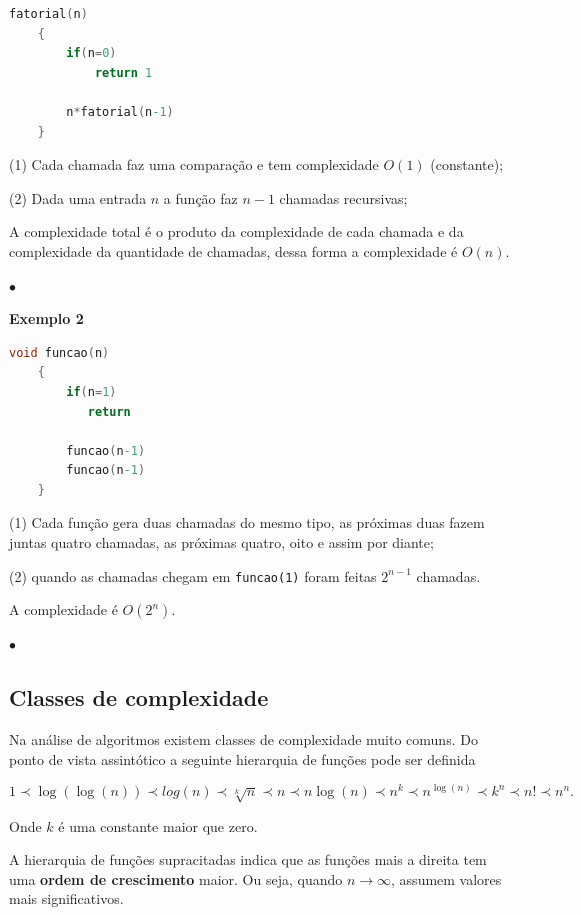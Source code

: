 \begin{lstlisting}[language=C, frame=single]
    fatorial(n)
    {
        if(n=0)
            return 1

        n*fatorial(n-1)
    }
\end{lstlisting}

(1) Cada chamada faz uma comparação e tem complexidade $O(1)$ (constante);

(2) Dada uma entrada $n$ a função faz $n-1$ chamadas recursivas;

A complexidade total é o produto da complexidade de cada chamada e da complexidade da quantidade de chamadas, dessa forma a complexidade é $O(n)$.


{\raggedleft $\bullet$ \par}

\textbf{Exemplo 2} 

\begin{lstlisting}[language=C, frame=single]
    void funcao(n)
    {
        if(n=1)
           return

        funcao(n-1)
        funcao(n-1)
    }
\end{lstlisting}

(1) Cada função gera duas chamadas do mesmo tipo, as próximas duas fazem juntas quatro chamadas, as próximas quatro, oito e assim por diante;

(2) quando as chamadas chegam em \texttt{funcao(1)} foram feitas $2^{n-1}$ chamadas.

A complexidade é $O(2^n)$.
 

{\raggedleft $\bullet$ \par}

\subsection{Classes de complexidade}

Na análise de algoritmos existem classes de complexidade muito comuns. Do ponto de vista assintótico a seguinte hierarquia de funções pode ser definida

\[1\prec \log(\log(n)) \prec log(n) \prec \sqrt[k]{n} \prec n \prec n\log(n) \prec n^k \prec n^{\log(n)} \prec k^n \prec n!\prec n^n.\]

Onde $k$ é uma constante maior que zero.

A hierarquia de funções supracitadas indica que as funções mais a direita tem uma \textbf{ordem de crescimento} maior. Ou seja, quando $n\rightarrow\infty$, assumem valores mais significativos.

